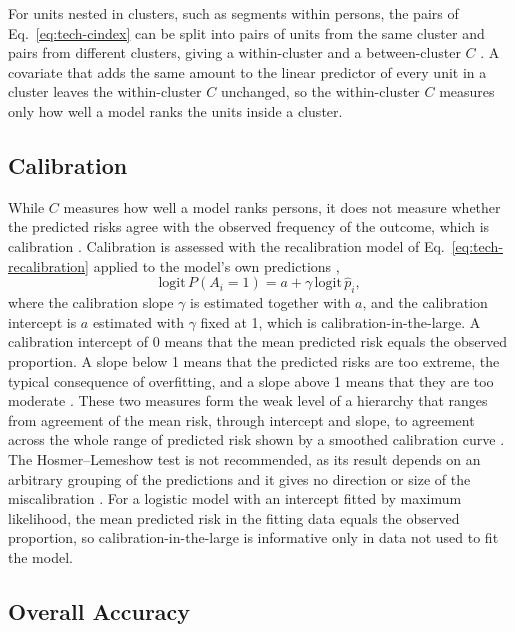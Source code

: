 For units nested in clusters, such as segments within persons, the pairs of Eq.~\eqref{eq:tech-cindex} can be split into pairs of units from the same cluster and pairs from different clusters, giving a within-cluster and a between-cluster $C$ \cite{vanklaveren2014clustered}.
A covariate that adds the same amount to the linear predictor of every unit in a cluster leaves the within-cluster $C$ unchanged, so the within-cluster $C$ measures only how well a model ranks the units inside a cluster.

\subsection{Calibration}
\label{sec:tech-calibration}

While $C$ measures how well a model ranks persons, it does not measure whether the predicted risks agree with the observed frequency of the outcome, which is calibration \cite{vancalster2019calibration}.
Calibration is assessed with the recalibration model of Eq.~\eqref{eq:tech-recalibration} applied to the model's own predictions \cite{cox1958binary},
\begin{equation}
  \mathrm{logit}\, P(A_i = 1) = a + \gamma\, \mathrm{logit}\, \hat p_i ,
  \label{eq:tech-calibration}
\end{equation}
where the calibration slope $\gamma$ is estimated together with $a$, and the calibration intercept is $a$ estimated with $\gamma$ fixed at 1, which is calibration-in-the-large.
A calibration intercept of 0 means that the mean predicted risk equals the observed proportion.
A slope below 1 means that the predicted risks are too extreme, the typical consequence of overfitting, and a slope above 1 means that they are too moderate \cite{vancalster2019calibration}.
These two measures form the weak level of a hierarchy that ranges from agreement of the mean risk, through intercept and slope, to agreement across the whole range of predicted risk shown by a smoothed calibration curve \cite{vancalster2016hierarchy}.
The Hosmer--Lemeshow test is not recommended, as its result depends on an arbitrary grouping of the predictions and it gives no direction or size of the miscalibration \cite{vancalster2019calibration}.
For a logistic model with an intercept fitted by maximum likelihood, the mean predicted risk in the fitting data equals the observed proportion, so calibration-in-the-large is informative only in data not used to fit the model.

\subsection{Overall Accuracy}
\label{sec:tech-accuracy}

